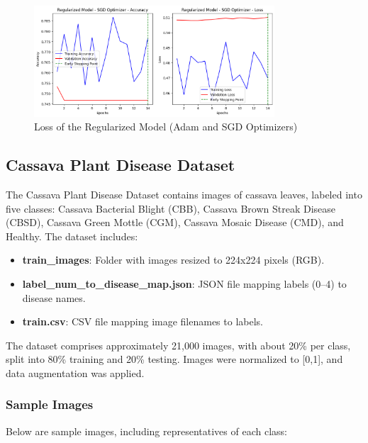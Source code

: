 \documentclass[a4paper,12pt]{article}
\begin{document}
\begin{figure}[H]
    \centering
    \includegraphics[width=0.8\textwidth]{assets/diabetes/sgd_diabetes_loss.png}
    \caption{Loss of the Regularized Model (Adam and SGD Optimizers)}
\end{figure}

\clearpage %

\subsection*{Cassava Plant Disease Dataset}
The Cassava Plant Disease Dataset contains images of cassava leaves, labeled into five classes: Cassava Bacterial Blight (CBB), Cassava Brown Streak Disease (CBSD), Cassava Green Mottle (CGM), Cassava Mosaic Disease (CMD), and Healthy. The dataset includes:
\begin{itemize}
    \item \textbf{train\_images}: Folder with images resized to 224x224 pixels (RGB).
    \item \textbf{label\_num\_to\_disease\_map.json}: JSON file mapping labels (0–4) to disease names.
    \item \textbf{train.csv}: CSV file mapping image filenames to labels.
\end{itemize}
The dataset comprises approximately 21,000 images, with about 20\% per class, split into 80\% training and 20\% testing. Images were normalized to [0,1], and data augmentation was applied.

\subsubsection*{Sample Images}
Below are sample images, including representatives of each class:
\end{document}
